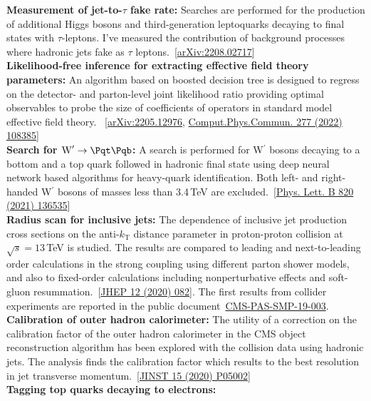 \documentclass[a4paper,11pt]{article}
\newcommand{\Pb}{{{\Pqb}}\xspace}
\newcommand{\Pt}{{{\Pqt}}\xspace}
\begin{document}
{\textbf{Measurement of jet-to-$\tau$ fake rate:}
Searches are performed for the production of additional Higgs bosons and third-generation leptoquarks decaying to final states with $\tau$-leptons.
I've measured the contribution of background processes where hadronic jets fake as $\tau$ leptons.~[\href{https://arxiv.org/abs/2208.02717}{arXiv:2208.02717}]\\
\textbf{Likelihood-free inference for extracting effective field theory parameters:}
An algorithm based on boosted decision tree is designed to regress on the detector- and parton-level joint likelihood ratio providing optimal observables to probe the size of coefficients of operators in standard model effective field theory.
~[\href{https://arxiv.org/abs/2205.12976}{arXiv:2205.12976}, \href{https://doi.org/10.1016/j.cpc.2022.108385}{Comput.Phys.Commun. 277 (2022) 108385}]\\
\textbf{Search for $\textrm{W}^\prime \rightarrow \Pt \Pb$:}
A search is performed for W$^\prime$ bosons decaying to a bottom and a top quark followed in hadronic final state using deep neural network based algorithms for heavy-quark identification.
Both left- and right-handed W$^\prime$ bosons of masses less than 3.4\,TeV are excluded.~[\href{https://doi.org/10.1016/j.physletb.2021.136535}{Phys. Lett. B 820 (2021) 136535}]\\
\textbf{Radius scan for inclusive jets:}
The dependence of inclusive jet production cross sections on the anti-$k_{\mathrm{T}}$ distance parameter in proton-proton collision at $\sqrt{s}=13$\,TeV is studied. The results are compared to leading and next-to-leading order calculations in the strong coupling using different parton shower models, and also to fixed-order calculations including nonperturbative effects and soft-gluon resummation.~[\href{https://doi.org/10.1007/JHEP12(2020)082}{JHEP 12 (2020) 082}]. The first results from collider experiments are reported in the public document~\href{http://cds.cern.ch/record/2682598?ln=en}{CMS-PAS-SMP-19-003}.\\
\textbf{Calibration of outer hadron calorimeter:}
The utility of a correction on the calibration factor of the outer hadron calorimeter in the CMS object reconstruction algorithm  has been explored with the collision data using hadronic jets. The analysis finds the calibration factor which results to the best resolution in jet transverse momentum.~[\href{https://doi.org/10.1088/1748-0221/15/05/P05002}{JINST 15 (2020) P05002}]\\
\textbf{Tagging top quarks decaying to electrons:}
}
\end{document}

